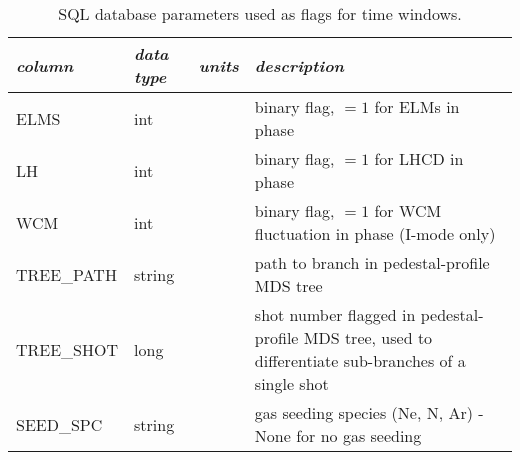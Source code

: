 \begin{longtabu} to 150mm {X[2.348,l]X[1,c]X[1,c]X[4.348,c]}
 \caption{SQL database parameters used as flags for time windows.}\label{tab:sql_flags} \\

 \toprule
 \emph{column} &
 \emph{data type} &
 \emph{units} &
 \emph{description}
 \\
 \midrule
 \endfirsthead
 \endhead

 \endfoot
 \bottomrule
 \endlastfoot

 ELMS &
 int &
 &
 binary flag, $=1$ for ELMs in phase
 \\
 LH &
 int &
 &
 binary flag, $=1$ for LHCD in phase
 \\
 WCM &
 int &
 &
 binary flag, $=1$ for WCM fluctuation in phase (I-mode only)
 \\
 TREE\_PATH &
 string &
 &
 path to branch in pedestal-profile MDS tree
 \\
 TREE\_SHOT &
 long &
 &
 shot number flagged in pedestal-profile MDS tree, used to differentiate sub-branches of a single shot
 \\
 SEED\_SPC &
 string &
 &
 gas seeding species (Ne, N, Ar) - None for no gas seeding
 \\

 \end{longtabu}

